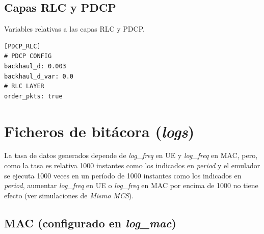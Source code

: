 \documentclass[12pt]{report} %
\begin{document}
\subsection* {Capas RLC y PDCP}

Variables relativas a las capas RLC y PDCP.

\begin{lstlisting}
[PDCP_RLC]
# PDCP CONFIG
backhaul_d: 0.003
backhaul_d_var: 0.0
# RLC LAYER
order_pkts: true
\end{lstlisting}

\section* {Ficheros de bitácora (\textit{logs})}

La tasa de datos generados depende de \textit{log\_freq} en UE y \textit{log\_freq} en MAC, pero, como la tasa es relativa 1000 instantes como los indicados en \textit{period} y el emulador se ejecuta 1000 veces en un período de 1000 instantes como los indicados en \textit{period}, aumentar \textit{log\_freq} en UE o \textit{log\_freq} en MAC por encima de 1000 no tiene efecto (ver simulaciones de \textit{Mismo MCS}).

\subsection* {MAC (configurado en \textit{log\_mac})}
\end{document}
